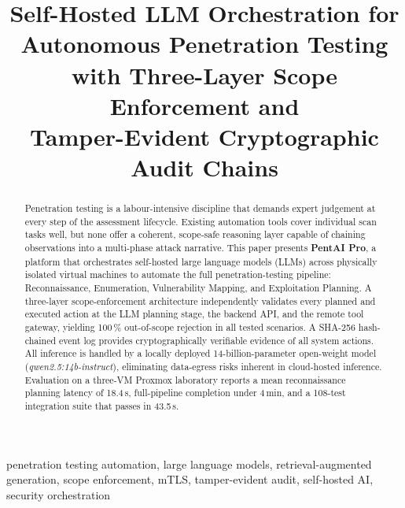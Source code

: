 \documentclass[conference]{IEEEtran}
\begin{document}
\title{Self-Hosted LLM Orchestration for Autonomous Penetration Testing\\
with Three-Layer Scope Enforcement and\\
Tamper-Evident Cryptographic Audit Chains}

\author{%
}

\maketitle

\begin{abstract}
Penetration testing is a labour-intensive discipline that demands expert judgement
at every step of the assessment lifecycle. Existing automation tools cover
individual scan tasks well, but none offer a coherent, scope-safe reasoning layer
capable of chaining observations into a multi-phase attack narrative.
This paper presents \textbf{PentAI Pro}, a platform that orchestrates
self-hosted large language models (LLMs) across physically isolated
virtual machines to automate the full penetration-testing pipeline:
Reconnaissance, Enumeration, Vulnerability Mapping, and Exploitation Planning.
A three-layer scope-enforcement architecture independently validates every
planned and executed action at the LLM planning stage, the backend API,
and the remote tool gateway, yielding 100\,\% out-of-scope rejection in
all tested scenarios.
A SHA-256 hash-chained event log provides cryptographically verifiable
evidence of all system actions.
All inference is handled by a locally deployed 14-billion-parameter
open-weight model (\textit{qwen2.5:14b-instruct}), eliminating data-egress
risks inherent in cloud-hosted inference.
Evaluation on a three-VM Proxmox laboratory reports a mean reconnaissance
planning latency of 18.4\,s, full-pipeline completion under 4\,min,
and a 108-test integration suite that passes in 43.5\,s.
\end{abstract}

\begin{IEEEkeywords}
penetration testing automation, large language models,
retrieval-augmented generation, scope enforcement, mTLS,
tamper-evident audit, self-hosted AI, security orchestration
\end{IEEEkeywords}
\end{document}
